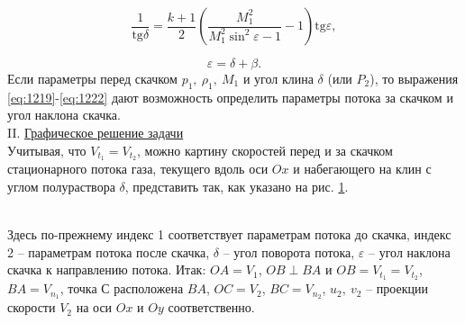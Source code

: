 \documentclass[specialist, subf, href, colorlinks=true, 14pt, final]{disser}
\theoremstyle{definition}
\newcommand{\tang}{\text{tg}}
\begin{document}
\addtocounter{equation}{1}
\begin{equation}\label{eq:1222}
  \frac{1}{\tang\delta} = \frac{k+1}{2}\left(\frac{M_{1}^{2}}{M_{1}^{2}\sin^{2}\varepsilon - 1} - 1\right)\tang\varepsilon,
  \tag{22}
\end{equation}
\addtocounter{equation}{1}
\begin{equation}\label{eq:1223}
  \varepsilon = \delta + \beta.
  \tag{23}
\end{equation}
Если параметры перед скачком $p_{1},\ \rho_{1},\ M_{1}$ и угол
клина $\delta$ (или $P_2$), то выражения \eqref{eq:1219}-\eqref{eq:1222} дают возможность определить параметры потока за скачком и угол наклона скачка.\\
II. \underline{Графическое решение задачи}\\
Учитывая, что $V_{t_1} = V_{t_2}$, можно картину скоростей перед и за
скачком стационарного потока газа, текущего вдоль оси $Ox$ и набегающего на клин с углом полураствора $\delta$, представить так, как указано на рис. \ref{1-2-3}.
\begin{figure}[!htp]
  \caption{}
  \label{1-2-3}
\end{figure}
\\
Здесь по-прежнему индекс 1 соответствует параметрам потока до скачка, индекс 2 -- параметрам потока после скачка, $\delta$ -- угол поворота потока, $\varepsilon$ -- угол наклона скачка к направлению потока. Итак: $OA = V_{1}$, $OB\perp BA$ и $OB = V_{t_1} = V_{t_2}$, $BA = V_{n_1}$, точка С расположена $BA$, $OC = V_2$, $BC = V_{n_2}$, $u_{2},\ v_{2}$ -- проекции скорости $V_2$ на оси $Ox$ и $Oy$ соответственно.\\
\end{document}
